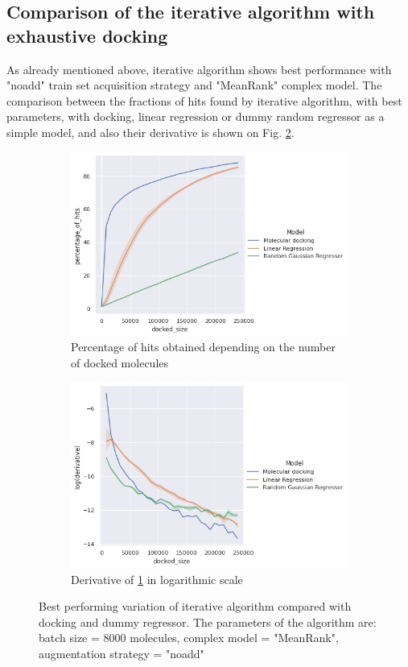 \subsection{Comparison of the iterative algorithm with exhaustive docking}

As already mentioned above, iterative algorithm shows best performance with "noadd" train set acquisition strategy and "MeanRank" complex model.
The comparison between the fractions of hits found by iterative algorithm, with best parameters, with docking,  linear regression or dummy random regressor as a simple model, and also their derivative is shown on Fig. \ref{best}. 


\begin{figure}[H]
\centering
\begin{subfigure}{0.85\textwidth}
\includegraphics[width=0.9\linewidth]{Images/4eiyPercentageOfHits.jpg} 
\caption{Percentage of hits obtained depending on the number of docked molecules}
\label{best1}
\end{subfigure}
\begin{subfigure}{0.85\textwidth}
\includegraphics[width=0.9\linewidth]{Images/4eiyDerivative.jpg}
\caption{Derivative of \ref{best1} in logarithmic scale}
\end{subfigure}

\caption{Best performing variation of iterative algorithm compared with docking and dummy regressor. The parameters of the algorithm are: batch size = 8000 molecules, complex model = "MeanRank", augmentation strategy = "noadd"}
\label{best}
\end{figure}


